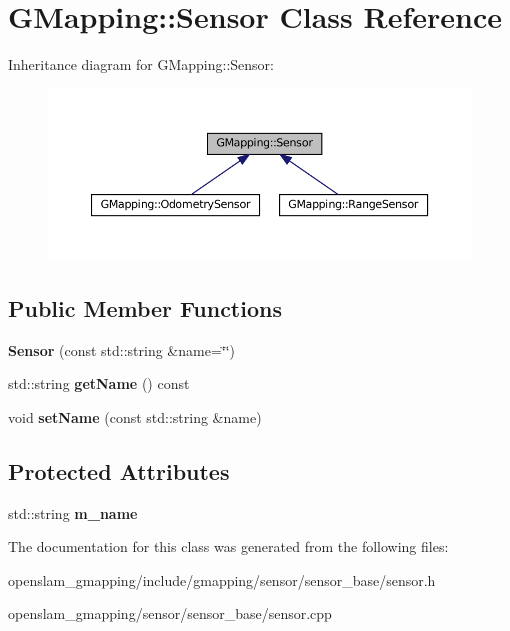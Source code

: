 \hypertarget{classGMapping_1_1Sensor}{}\section{G\+Mapping\+:\+:Sensor Class Reference}
\label{classGMapping_1_1Sensor}


Inheritance diagram for G\+Mapping\+:\+:Sensor\+:
\nopagebreak
\begin{figure}[H]
\begin{center}
\leavevmode
\includegraphics[width=350pt]{classGMapping_1_1Sensor__inherit__graph}
\end{center}
\end{figure}
\subsection*{Public Member Functions}
\begin{DoxyCompactItemize}
\item 
\mbox{\label{classGMapping_1_1Sensor_a3bfb72525656fca739350da7e06c9231}} 
{\bfseries Sensor} (const std\+::string \&name=\char`\"{}\char`\"{})
\item 
\mbox{\label{classGMapping_1_1Sensor_a6e4077cd7879e47c47cdaa89cc4ce05b}} 
std\+::string {\bfseries get\+Name} () const
\item 
\mbox{\label{classGMapping_1_1Sensor_ac11338217e237d1134955fb5c7c445ef}} 
void {\bfseries set\+Name} (const std\+::string \&name)
\end{DoxyCompactItemize}
\subsection*{Protected Attributes}
\begin{DoxyCompactItemize}
\item 
\mbox{\label{classGMapping_1_1Sensor_a91dc87e315f9d73c67c6700bf5d12d13}} 
std\+::string {\bfseries m\+\_\+name}
\end{DoxyCompactItemize}


The documentation for this class was generated from the following files\+:\begin{DoxyCompactItemize}
\item 
openslam\+\_\+gmapping/include/gmapping/sensor/sensor\+\_\+base/sensor.\+h\item 
openslam\+\_\+gmapping/sensor/sensor\+\_\+base/sensor.\+cpp\end{DoxyCompactItemize}
